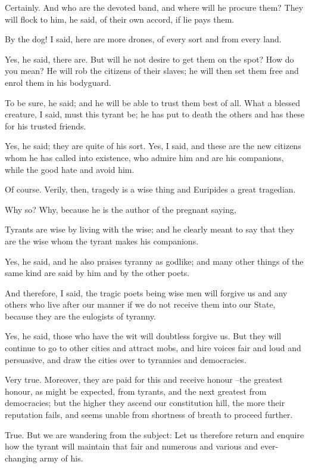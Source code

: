 Certainly.
And who are the devoted band, and where will he procure them?
They will flock to him, he said, of their own accord, if lie pays them.

By the dog! I said, here are more drones, of every sort and from every land.

Yes, he said, there are.
But will he not desire to get them on the spot?
How do you mean?
He will rob the citizens of their slaves; he will then set them free and enrol them in his bodyguard.

To be sure, he said; and he will be able to trust them best of all.
What a blessed creature, I said, must this tyrant be; he has put to death the others and has these for his trusted friends.

Yes, he said; they are quite of his sort.
Yes, I said, and these are the new citizens whom he has called into existence, who admire him and are his companions, while the good hate and avoid him.

Of course.
Verily, then, tragedy is a wise thing and Euripides a great tragedian.

Why so?
Why, because he is the author of the pregnant saying,

Tyrants are wise by living with the wise; and he clearly meant to say that they are the wise whom the tyrant makes his companions.

Yes, he said, and he also praises tyranny as godlike; and many other things of the same kind are said by him and by the other poets.

And therefore, I said, the tragic poets being wise men will forgive us and any others who live after our manner if we do not receive them into our State, because they are the eulogists of tyranny.

Yes, he said, those who have the wit will doubtless forgive us.
But they will continue to go to other cities and attract mobs, and hire voices fair and loud and persuasive, and draw the cities over to tyrannies and democracies.

Very true.
Moreover, they are paid for this and receive honour --the greatest honour, as might be expected, from tyrants, and the next greatest from democracies; but the higher they ascend our constitution hill, the more their reputation fails, and seems unable from shortness of breath to proceed further.

True.
But we are wandering from the subject: Let us therefore return and enquire how the tyrant will maintain that fair and numerous and various and ever-changing army of his.


